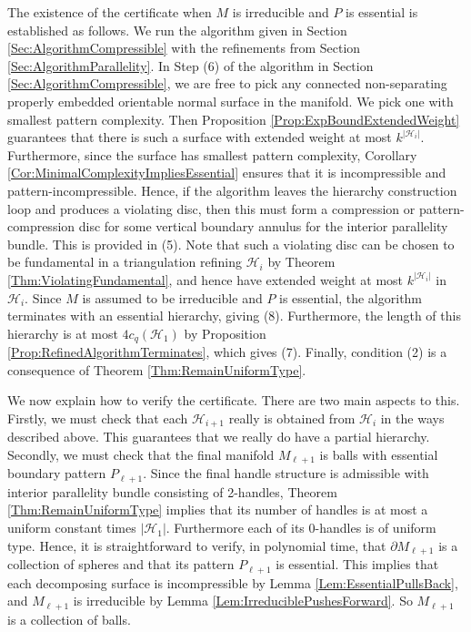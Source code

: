 \documentclass[oneside]{amsart}
\numberwithin{equation}{section}
\theoremstyle{plain}
\theoremstyle{definition}
\begin{document}
The existence of the certificate when $M$ is irreducible and $P$ is essential is established as follows. We run the algorithm given in Section \ref{Sec:AlgorithmCompressible} with the refinements from Section \ref{Sec:AlgorithmParallelity}. In Step (6) of the algorithm in Section \ref{Sec:AlgorithmCompressible}, we are free to pick any connected non-separating properly embedded orientable normal surface in the manifold. We pick one with smallest pattern complexity. Then Proposition \ref{Prop:ExpBoundExtendedWeight} guarantees that there is such a surface with extended weight at most $k^{|\mathcal{H}_i|}$. Furthermore, since the surface has smallest pattern complexity, Corollary \ref{Cor:MinimalComplexityImpliesEssential} ensures that it is incompressible and pattern-incompressible. Hence, if the algorithm leaves the hierarchy construction loop and produces a violating disc, then this must form a compression or pattern-compression disc for some vertical boundary annulus for the interior parallelity bundle. This is provided in (5). Note that such a violating disc can be chosen to be fundamental in a triangulation refining $\mathcal{H}_i$ by Theorem \ref{Thm:ViolatingFundamental}, and hence have extended weight at most $k^{|\mathcal{H}_i|}$ in $\mathcal{H}_i$. Since $M$ is assumed to be irreducible and $P$ is essential, the algorithm terminates with an essential hierarchy, giving (8). Furthermore, the length of this hierarchy is at most $4c_q(\mathcal{H}_1)$ by Proposition \ref{Prop:RefinedAlgorithmTerminates}, which gives (7). Finally, condition (2) is a consequence of Theorem \ref{Thm:RemainUniformType}.

We now explain how to verify the certificate. There are two main aspects to this. Firstly, we must check that each $\mathcal{H}_{i+1}$ really is obtained from $\mathcal{H}_i$ in the ways described above. This guarantees that we really do have a partial hierarchy. Secondly, we must check that the final manifold $M_{\ell+1}$ is balls with essential boundary pattern $P_{\ell+1}$. Since the final handle structure is admissible with interior parallelity bundle consisting of 2-handles, Theorem  \ref{Thm:RemainUniformType} implies that its number of handles is at most a uniform constant times $|\mathcal{H}_1|$. Furthermore each of its 0-handles is of uniform type. Hence, it is straightforward to verify, in polynomial time, that $\partial M_{\ell+1}$ is a collection of spheres and that its pattern $P_{\ell+1}$ is essential.
This implies that each decomposing surface is incompressible by Lemma \ref{Lem:EssentialPullsBack}, and $M_{\ell+1}$ is irreducible by Lemma \ref{Lem:IrreduciblePushesForward}. So $M_{\ell+1}$ is a collection of balls.
\end{document}
